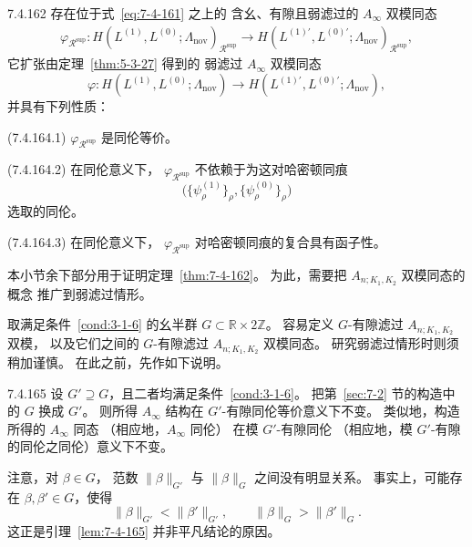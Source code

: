 \begin{theorem}{7.4.162}\label{thm:7-4-162}
存在位于式~\eqref{eq:7-4-161} 之上的
含幺、有隙且弱滤过的 $A_\infty$ 双模同态
\begin{equation}
\begin{aligned}
\varphi_{\mathcal R^{\mathrm{sup}}}\colon
H(L^{(1)},L^{(0)};\Lambda_{\mathrm{nov}})_
{\mathcal R^{\mathrm{sup}}}
\longrightarrow
H(L^{(1)\prime},L^{(0)\prime};\Lambda_{\mathrm{nov}})_
{\mathcal R^{\mathrm{sup}}},
\end{aligned}
\tag{7.4.163}\label{eq:7-4-163}
\end{equation}
它扩张由定理~\ref{thm:5-3-27} 得到的
弱滤过 $A_\infty$ 双模同态
\[
\varphi\colon
H(L^{(1)},L^{(0)};\Lambda_{\mathrm{nov}})
\longrightarrow
H(L^{(1)\prime},L^{(0)\prime};\Lambda_{\mathrm{nov}}),
\]
并具有下列性质：

\par\noindent\textup{(7.4.164.1)}\label{cond:7-4-164-1}\quad
$\varphi_{\mathcal R^{\mathrm{sup}}}$ 是同伦等价。

\par\noindent\textup{(7.4.164.2)}\label{cond:7-4-164-2}\quad
在同伦意义下，
$\varphi_{\mathcal R^{\mathrm{sup}}}$
不依赖于为这对哈密顿同痕
\[
\bigl(
\{\psi^{(1)}_\rho\}_\rho,
\{\psi^{(0)}_\rho\}_\rho
\bigr)
\]
选取的同伦。

\par\noindent\textup{(7.4.164.3)}\label{cond:7-4-164-3}\quad
在同伦意义下，
$\varphi_{\mathcal R^{\mathrm{sup}}}$
对哈密顿同痕的复合具有函子性。
\end{theorem}

本小节余下部分用于证明定理~\ref{thm:7-4-162}。
为此，需要把 $A_{n;K_1,K_2}$ 双模同态的概念
推广到弱滤过情形。

取满足条件~\ref{cond:3-1-6} 的幺半群
$G\subset\mathbb R\times2\mathbb Z$。
容易定义 $G$-有隙滤过 $A_{n;K_1,K_2}$ 双模，
以及它们之间的
$G$-有隙滤过 $A_{n;K_1,K_2}$ 双模同态。
研究弱滤过情形时则须稍加谨慎。
在此之前，先作如下说明。

\begin{lemma}{7.4.165}\label{lem:7-4-165}
设 $G'\supseteq G$，且二者均满足条件~\ref{cond:3-1-6}。
把第~\ref{sec:7-2} 节的构造中的 $G$ 换成 $G'$。
则所得 $A_\infty$ 结构在
$G'$-有隙同伦等价意义下不变。
类似地，构造所得的 $A_\infty$ 同态
（相应地，$A_\infty$ 同伦）
在模 $G'$-有隙同伦
（相应地，模 $G'$-有隙的同伦之同伦）意义下不变。
\end{lemma}

注意，对 $\beta\in G$，
范数 $\|\beta\|_{G'}$ 与 $\|\beta\|_G$
之间没有明显关系。
事实上，可能存在 $\beta,\beta'\in G$，使得
\[
\|\beta\|_{G'}<\|\beta'\|_{G'},
\qquad
\|\beta\|_G>\|\beta'\|_G.
\]
这正是引理~\ref{lem:7-4-165} 并非平凡结论的原因。

